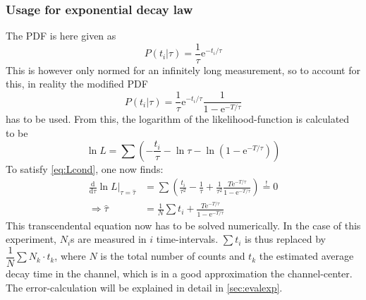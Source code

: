 \documentclass[english,  %
parskip=full,   %
headsepline]{scrartcl}
\newcommand{\diff}[1]{\frac{\mathrm{d}}{\mathrm{d}#1}}
\newcommand{\e}{\mathrm{e}}
\begin{document}
\subsubsection{Usage for exponential decay law}
The PDF is here given as 
\[
P(t_i|\tau)=\frac{1}{\tau}\e^{-t_i/\tau}
\]
This is however only normed for an infinitely long measurement, so to account for this, in reality the modified PDF
\[
P(t_i|\tau)=\frac{1}{\tau}\e^{-t_i/\tau}\frac{1}{1-\e^{-T/\tau}}
\]
has to be used. From this, the logarithm of the likelihood-function is calculated to be 
\[
\ln L=\sum\left(-\frac{t_i}{\tau}-\ln\tau-\ln\left(1-\e^{-T/\tau}\right)\right)\label{eq:Lexp}
\]
To satisfy \cref{eq:Lcond}, one now finds:
\begin{align}
\diff{\tau}\ln L\left. \right|_{\tau=\hat{\tau}}&=\sum\left(\frac{t_i}{\tau^2}-\frac{1}{\tau}+\frac{1}{\tau^2}\frac{T\e^{-T/\tau}}{1-\e^{-T/\tau}}\right)\overset{!}{=}0\\
\Rightarrow\hat{\tau}&=\frac{1}{N}\sum t_i+\frac{T\e^{-T/\tau}}{1-\e^{-T/\tau}}
\end{align}
This transcendental equation now has to be solved numerically. In the case of this experiment, $N_i$s are measured in $i$ time-intervals. $\sum t_i$ is thus replaced by $\dfrac{1}{N}\sum N_k\cdot t_k$, where $N$ is the total number of counts and $t_k$ the estimated average decay time in the channel, which is in a good approximation the channel-center. The error-calculation will be explained in detail in \cref{sec:evalexp}.
\end{document}
